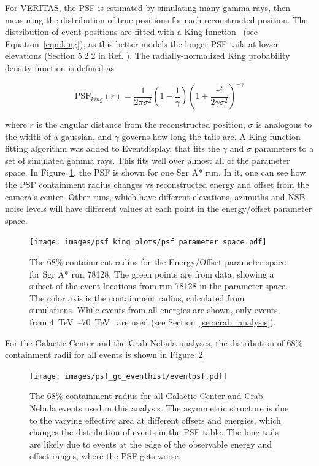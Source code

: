 {    For VERITAS, the PSF is estimated by simulating many gamma rays, then measuring the distribution of true positions for each reconstructed position.
    The distribution of event positions are fitted with a King function~\cite{king1962} (see Equation~\ref{eqn:king}), as this better models the longer PSF tails at lower elevations (Section 5.2.2 in Ref. \cite{Mayer2015}).
    The radially-normalized King probability density function is defined as

    \begin{equation} \label{eqn:king}
    \text{PSF}_{king}(r) = \frac{1}{2 \pi \sigma^{2} } \left( 1 - \frac{1}{\gamma} \right) \left( 1 + \frac{ r^{2} }{ 2 \gamma \sigma^{2} } \right)^{-\gamma}
    \end{equation}

    where $r$ is the angular distance from the reconstructed position, $\sigma$ is analogous to the width of a gaussian, and $\gamma$ governs how long the tails are.
    A King function fitting algorithm was added to Eventdisplay, that fits the $\gamma$ and $\sigma$ parameters to a set of simulated gamma rays.
    This fits well over almost all of the parameter space.
    In Figure~\ref{fig:psf_paramspace}, the PSF is shown for one Sgr A* run.
    In it, one can see how the PSF containment radius changes vs reconstructed energy and offset from the camera's center.
    Other runs, which have different elevations, azimuths and NSB noise levels will have different values at each point in the energy/offset parameter space.

    \begin{figure}[!ht]
      \centering
      \texttt{[image: images/psf\_king\_plots/psf\_parameter\_space.pdf]}
      \caption[PSF Parameter Space]{
        The 68\% containment radius for the Energy/Offset parameter space for Sgr A* run 78128. 
        The green points are from data, showing a subset of the event locations from run 78128 in the parameter space.
        The color axis is the containment radius, calculated from simulations.
        While events from all energies are shown, only events from \SIrange{4}{70}{\TeV{}} are used (see Section~\ref{sec:crab_analysis}).
      }
      \label{fig:psf_paramspace}
    \end{figure}

    For the Galactic Center and the Crab Nebula analyses, the distribution of 68\% containment radii for all events is shown in Figure~\ref{fig:gc_psf_hist}.

    \begin{figure}[!hb]
      \centering
      \texttt{[image: images/psf\_gc\_eventhist/eventpsf.pdf]}
      \caption[Crab and Galactic Center Event PSFs]{
        The 68\% containment radius for all Galactic Center and Crab Nebula events used in this analysis.
        The asymmetric structure is due to the varying effective area at different offsets and energies, which changes the distribution of events in the PSF table.
        The long tails are likely due to events at the edge of the observable energy and offset ranges, where the PSF gets worse.
      }
      \label{fig:gc_psf_hist}
    \end{figure}
  
}
